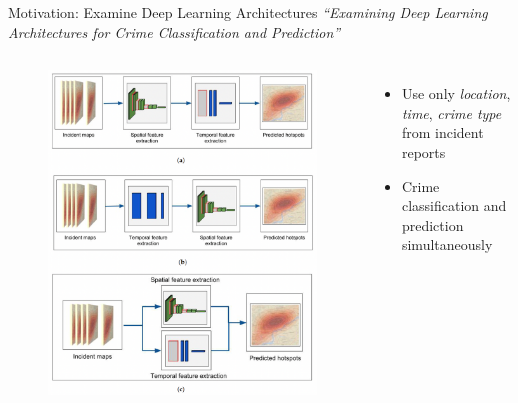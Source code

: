 \documentclass[10pt]{beamer}
\begin{document}
\begin{frame}{Motivation: Examine Deep Learning Architectures}
\emph{``Examining Deep Learning Architectures for Crime Classification
and Prediction'' \citep{stalidis2021examining}}
\begin{columns}[onlytextwidth]
        \begin{figure}
            \centering
            \includegraphics[width=1\textwidth]{ExamDL.png}
        \end{figure}
        \begin{itemize}
            \item Use only \emph{location}, \emph{time}, \emph{crime type} from incident reports
            \item Crime classification and prediction simultaneously
        \end{itemize}
\end{columns}

\end{frame}
\end{document}
